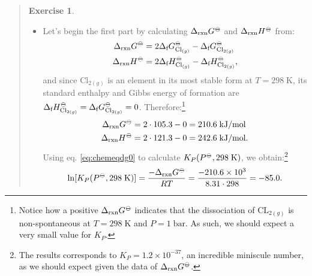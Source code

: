 \documentclass[
  9pt,
]{extbook}
\theoremstyle{definition}
\theoremstyle{definition}
\theoremstyle{definition}
\newtheorem{exercise}{Exercise}[chapter]
\theoremstyle{definition}
\theoremstyle{remark}
\begin{document}
\begin{quote}
\begin{exercise}
\begin{itemize}
\item
  Let's begin the first part by calculating \(\Delta_{\text{rxn}} G^{-\kern-6pt{\ominus}\kern-6pt-}\) and \(\Delta_{\text{rxn}} H^{-\kern-6pt{\ominus}\kern-6pt-}\) from:
  \begin{equation}
  \begin{aligned}
  \Delta_{\text{rxn}} G^{-\kern-6pt{\ominus}\kern-6pt-}&= 2 \Delta_{\text{f}} G^{-\kern-6pt{\ominus}\kern-6pt-}_{\text{Cl}_{(g)}} - \Delta_{\text{f}} G^{-\kern-6pt{\ominus}\kern-6pt-}_{\text{Cl}_{2(g)}} \\
  \Delta_{\text{rxn}} H^{-\kern-6pt{\ominus}\kern-6pt-}&= 2 \Delta_{\text{f}} H^{-\kern-6pt{\ominus}\kern-6pt-}_{\text{Cl}_{(g)}} - \Delta_{\text{f}} H^{-\kern-6pt{\ominus}\kern-6pt-}_{\text{Cl}_{2(g)}},
  \end{aligned}
  \end{equation}
  and since \(\text{Cl}_{2(g)}\) is an element in its most stable form at \(T=298\;\mathrm{K}\), its standard enthalpy and Gibbs energy of formation are \(\Delta_{\text{f}} H^{-\kern-6pt{\ominus}\kern-6pt-}_{\text{Cl}_{2(g)}} = \Delta_{\text{f}} G^{-\kern-6pt{\ominus}\kern-6pt-}_{\text{Cl}_{2(g)}} = 0\). Therefore:\footnote{Notice how a positive \(\Delta_{\text{rxn}} G^{-\kern-6pt{\ominus}\kern-6pt-}\) indicates that the dissociation of \(\mathrm{CL}_{2(g)}\) is non-spontaneous at \(T=298\;\text{K}\) and \(P=1\;\text{bar}\). As such, we should expect a very small value for \(K_P\).}
  \begin{equation}
  \begin{aligned}
  \Delta_{\text{rxn}} G^{-\kern-6pt{\ominus}\kern-6pt-}&= 2 \cdot 105.3 - 0 = 210.6 \;\text{kJ/mol} \\
  \Delta_{\text{rxn}} H^{-\kern-6pt{\ominus}\kern-6pt-}&= 2 \cdot 121.3 - 0 = 242.6\;\text{kJ/mol}.
  \end{aligned}
  \end{equation}
  Using eq. \eqref{eq:chemeqdg0} to calculate \(K_P (P^{-\kern-6pt{\ominus}\kern-6pt-},298\;\text{K})\), we obtain:\footnote{The results corresponds to \(K_P=1.2\times 10^{-37}\), an incredible miniscule number, as we should expect given the data of \(\Delta_{\text{rxn}} G^{-\kern-6pt{\ominus}\kern-6pt-}\).}
  \begin{equation}
  \ln [ K_P (P^{-\kern-6pt{\ominus}\kern-6pt-},298\;\text{K}) ] =  \frac{ - \Delta_{\text{rxn}} G^{-\kern-6pt{\ominus}\kern-6pt-}}{RT}  =  \frac{-210.6\times10^3}{8.31 \cdot 298} = - 85.0.
  \end{equation}

\end{itemize}
\end{exercise}
\end{quote}
\end{document}
